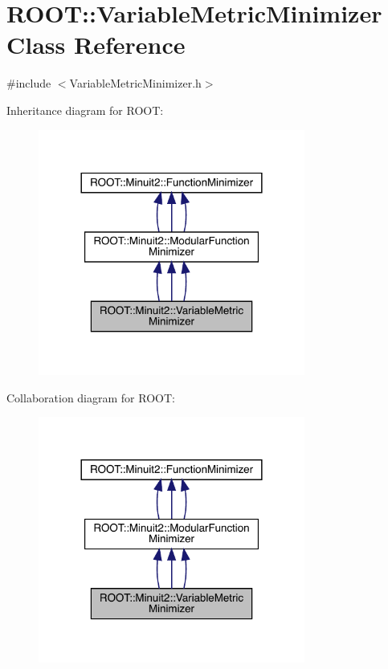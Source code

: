 \hypertarget{classROOT_1_1Minuit2_1_1VariableMetricMinimizer}{}\section{R\+O\+OT\+:\+:Variable\+Metric\+Minimizer Class Reference}
\label{classROOT_1_1Minuit2_1_1VariableMetricMinimizer}


{\ttfamily \#include $<$Variable\+Metric\+Minimizer.\+h$>$}



Inheritance diagram for R\+O\+OT\+:
\nopagebreak
\begin{figure}[H]
\begin{center}
\leavevmode
\includegraphics[width=248pt]{dc/d1b/classROOT_1_1Minuit2_1_1VariableMetricMinimizer__inherit__graph}
\end{center}
\end{figure}


Collaboration diagram for R\+O\+OT\+:
\nopagebreak
\begin{figure}[H]
\begin{center}
\leavevmode
\includegraphics[width=248pt]{dd/d50/classROOT_1_1Minuit2_1_1VariableMetricMinimizer__coll__graph}
\end{center}
\end{figure}

